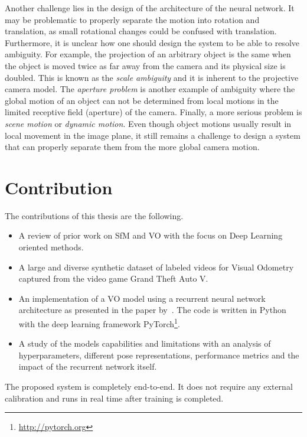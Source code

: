 		Another challenge lies in the design of the architecture of the neural network.
		It may be problematic to properly separate the motion into rotation and translation, as small rotational changes could be confused with translation.
		Furthermore, it is unclear how one should design the system to be able to resolve ambiguity.
		For example, the projection of an arbitrary object is the same when the object is moved twice as far away from the camera and its physical size is doubled.
		This is known as the \emph{scale ambiguity} and it is inherent to the projective camera model.
		The \emph{aperture problem} is another example of ambiguity where the global motion of an object can not be determined from local motions in the limited receptive field (aperture) of the camera.
		Finally, a more serious problem is \emph{scene motion} or \emph{dynamic motion}.
		Even though object motions usually result in local movement in the image plane, it still remains a challenge to design a system that can properly separate them from the more global camera motion.
		
	
	\section{Contribution}
		
		The contributions of this thesis are the following.
		\begin{itemize}
			\item A review of prior work on SfM and VO with the focus on Deep Learning oriented methods.
			
			\item A large and diverse synthetic dataset of labeled videos for Visual Odometry captured from the video game Grand Theft Auto V.
			
			\item An implementation of a VO model using a recurrent neural network architecture as presented in the paper by~\cite{wang2017deepvo}.
			The code is written in Python with the deep learning framework PyTorch\footnote{\url{http://pytorch.org}}.
			
			\item A study of the models capabilities and limitations with an analysis of hyperparameters, different pose representations, performance metrics and the impact of the recurrent network itself.
		\end{itemize}
		The proposed system is completely end-to-end.
		It does not require any external calibration and runs in real time after training is completed.
	
